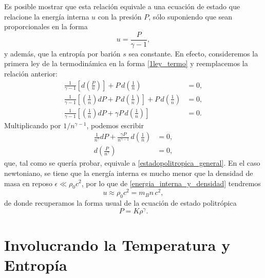 Es posible mostrar que esta relación equivale a una ecuación de estado que relacione la energía interna $u$ con la presión $P$, sólo suponiendo que sean proporcionales en la forma
\begin{equation}\label{estadopolitropica_alterna}
\boxed{ u=\frac{P}{\gamma-1},}
\end{equation}
y además, que la entropía por barión $s$ sea constante. En efecto, consideremos la primera ley de la termodinámica en la forma \eqref{1ley_termo} y reemplacemos la relación anterior:
\begin{align}
 \frac{1}{\gamma-1}\left[d\left(\frac{P}{n}\right)\right]+P\,d\left(\frac{1}{n}\right)&=0,\\
\frac{1}{\gamma-1}\left[\left(\frac{1}{n}\right)dP+P\,d\left(\frac{1}{n}\right)\right]+P\,d\left(\frac{1}{n}\right)&=0,\\
\frac{1}{\gamma-1}\left[\left(\frac{1}{n}\right)dP+\gamma P\, d\left(\frac{1}{n}\right)\right]&=0.
\end{align}
Multiplicando por $1/n^{\gamma-1}$, podemos escribir
\begin{align}
\frac{1}{n^{\gamma}}dP+\frac{\gamma P}{n^{\gamma-1}}\,d\left(\frac{1}{n}\right)&=0,\\
d\left(\frac{P}{n^{\gamma}}\right)&=0,
\end{align}
que, tal como se quería probar, equivale a \eqref{estadopolitropica_general}. En el caso newtoniano, se tiene que la energía interna es mucho menor que la densidad de masa en reposo $\epsilon\ll \rho_0 c^2$, por lo que de \eqref{energia_interna_y_densidad} tendremos
\begin{equation}
u\approx \rho_0c^2=m_Bn\,c^2,
\end{equation}
de donde recuperamos la forma usual de la ecuación de estado politrópica
\begin{equation}\label{estadopolitropica}
 \boxed{P=K\rho^{\gamma}.}
\end{equation}

\section{Involucrando la Temperatura y Entropía}

